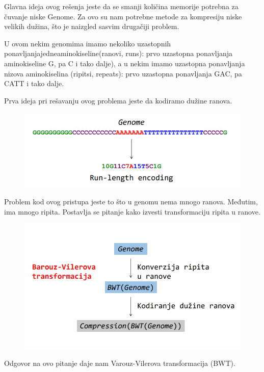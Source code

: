 Glavna ideja ovog rešenja jeste da se smanji količina memorije potrebna za čuvanje niske Genome. Za ovo su nam potrebne metode za kompresiju niske velikih dužina, što je naizgled sasvim drugačiji problem.

U ovom nekim genomima imamo nekoliko uzastopnih ponavljanjajedneaminokiseline(ranovi, runs): prvo uzastopna ponavljanja aminokiseline G, pa C i tako dalje), a u nekim imamo uzastopna ponavljanja nizova aminokiselina (ripitsi, repeats): prvo uzastopna ponavljanja GAC, pa CATT i tako dalje.

Prva ideja pri rešavanju ovog problema jeste da kodiramo dužine ranova.
\begin{figure}[h!]
\centering
\includegraphics[scale=0.5]{poglavlja/9/slike/kompresijaGenoma.png}
\caption{}
\label{slika:X}
\end{figure}

Problem kod ovog pristupa jeste to što u genomu nema mnogo ranova. Međutim, ima mnogo ripita.
Postavlja se pitanje kako izvesti transformaciju ripita u ranove.
\begin{figure}[h!]
\centering
\includegraphics[scale=0.5]{poglavlja/9/slike/konversijaRipitaUranove.png}
\caption{}
\label{slika:X}
\end{figure}

Odgovor na ovo pitanje daje nam Varouz-Vilerova transformacija (BWT).


